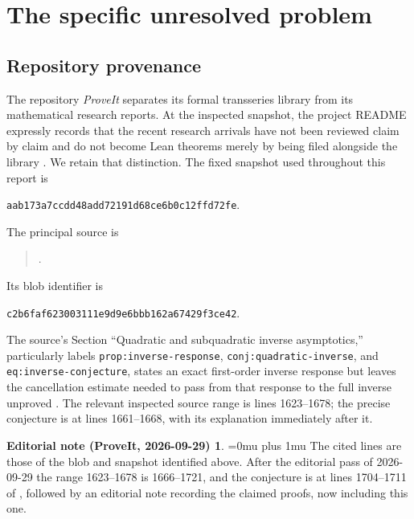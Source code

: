 \documentclass[11pt,a4paper]{article}
\numberwithin{equation}{section}
\theoremstyle{definition}\newtheorem{definition}[theorem]{Definition}
\theoremstyle{remark}\newtheorem{remark}[theorem]{Remark}
\theoremstyle{definition}
\newtheorem*{ednoteinner}{Editorial note (ProveIt, 2026-09-29)}
\newenvironment{ednote}{\begin{ednoteinner}\sloppy\Urlmuskip=0mu plus 1mu\relax}{\end{ednoteinner}}
\newcommand{\RepoCommit}{aab173a7ccdd48add72191d68ce6b0c12ffd72fe}
\begin{document}
\hypersetup{pageanchor=true}
\tableofcontents
\newpage

\section{The specific unresolved problem}
\label{sec:context}

\subsection{Repository provenance}
The repository \emph{ProveIt} separates its formal transseries library from
its mathematical research reports. At the inspected snapshot, the project
README expressly records that the recent research arrivals have not been
reviewed claim by claim and do not become Lean theorems merely by being
filed alongside the library \cite{repo,inventory}. We retain that distinction.
The fixed snapshot used throughout this report is
\begin{center}\small\texttt{\RepoCommit}.\end{center}
The principal source is
\begin{quote}\small\raggedright
{}\allowbreak
{}.
\end{quote}
Its blob identifier is
\begin{center}\small\texttt{c2b6faf623003111e9d9e6bbb162a67429f3ce42}.\end{center}
The source's Section ``Quadratic and subquadratic inverse asymptotics,''
particularly labels \texttt{prop:inverse-response},
\texttt{conj:quadratic-inverse}, and \texttt{eq:inverse-conjecture}, states
an exact first-order inverse response but leaves the cancellation estimate
needed to pass from that response to the full inverse unproved \cite{finitecore}.
The relevant inspected source range is lines 1623--1678; the precise
conjecture is at lines 1661--1668, with its explanation immediately after it.
\begin{ednote}
The cited lines are those of the blob and snapshot identified above. After the editorial pass of 2026-09-29 the range
1623--1678 is 1666--1721, and the conjecture is at lines 1704--1711 of
, followed
by an editorial note recording the claimed proofs, now including this one.
\end{ednote}
\end{document}
